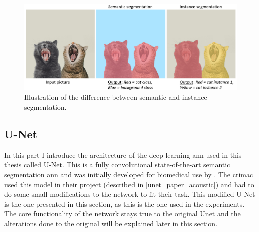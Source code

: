     \begin{figure}[H]
        \centering
        \includegraphics[scale=0.4]{figures/segmentation.png}
        \caption[Difference between semantic and instance segmentation]{Illustration of the difference between semantic and instance segmentation.}
      	\medskip 
        \label{segmentation_fig}
    \end{figure}
    
    

\subsection{U-Net} \label{unet}
    In this part I introduce the architecture of the deep learning \gls{ann} used in this thesis called U-Net. This is a fully convolutional state-of-the-art\cite{rajak2021segmentation} semantic segmentation \gls{ann} and was initially developed for biomedical use by \citeauthor{unet_ronneberger2015}\cite{unet_ronneberger2015}. The \gls{crimac} used this model in their project (described in \ref{unet_paper_acoustic}) and had to do some small modifications to the network to fit their task. This modified U-Net is the one presented in this section, as this is the one used in the experiments. The core functionality of the network stays true to the original Unet and the alterations done to the original will be explained later in this section.
    
